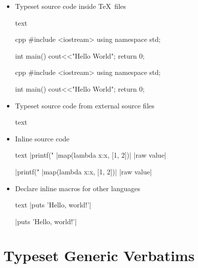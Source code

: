 \documentclass[letterpaper, 11pt, DIV=11]{scrartcl}
\begin{document}
\begin{itemize}

\item Typeset source code inside \TeX\ files

\begin{tcbsrccode}{text}
\begin{tcbcode}{cpp}
#include <iostream>  
using namespace std; 

int main(){ 
    cout<<"Hello World\n"; 
    return 0; 
} 
\end{tcbcode}
\end{tcbsrccode}
\begin{tcbcode}{cpp}
#include <iostream>  
using namespace std; 

int main(){ 
    cout<<"Hello World\n"; 
    return 0; 
} 
\end{tcbcode}


\item Typeset source code from external source files

\begin{tcbsrccode}{text}
\end{tcbsrccode}

\item Inline source code

\begin{tcbsrccode}{text}
\cinline|printf("%
\pyinline|map(lambda x:x, [1, 2])|
\rawinline|raw value|
\end{tcbsrccode}
\cinline|printf("%
\pyinline|map(lambda x:x, [1, 2])|
\rawinline|raw value|

\item Declare inline macros for other languages

\begin{tcbsrccode}{text}
\rubyinline|puts 'Hello, world!'|
\end{tcbsrccode}
\rubyinline|puts 'Hello, world!'|

\end{itemize}

\section{Typeset Generic Verbatims}
\end{document}
